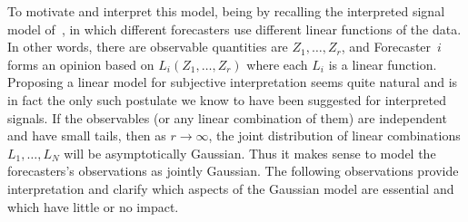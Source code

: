 \documentclass[11pt]{article}
\theoremstyle{definition}
\theoremstyle{definition}
\begin{document}
To motivate and interpret this model, being by recalling the 
interpreted signal model of~\citet{broomell2009experts}, in which 
different forecasters use different linear functions of the data.  
In other words, there are observable quantities are $Z_1 , \ldots , Z_r$, 
and Forecaster~$i$ forms an opinion based on $L_i (Z_1 , \ldots , Z_r)$ 
where each $L_i$ is a linear function.  Proposing a linear model
for subjective interpretation seems quite natural and is in fact
the only such postulate we know to have been suggested for 
interpreted signals.
If the observables (or any linear combination of them)
are independent and have small tails, then as $r \to \infty$, the
joint distribution of linear combinations $L_1 , \ldots , L_N$
will be asymptotically Gaussian.  Thus it makes sense to model
the forecasters's observations as jointly Gaussian.  The following
observations provide interpretation and clarify which aspects of the
Gaussian model are essential and which have little or no impact.
\end{document}
